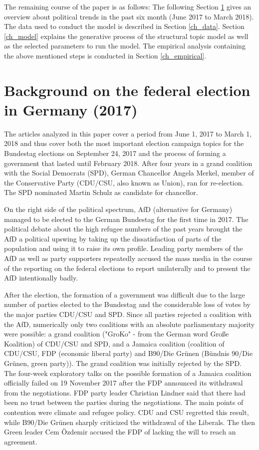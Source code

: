 \documentclass[12pt,a4paper,notitlepage]{article}
\begin{document}
The remaining course of the paper is as follows: The following Section \ref{ch_elections} gives an overview about political trends in the past six month (June 2017 to March 2018). The data used to conduct the model is described in Section \ref{ch_data}. Section \ref{ch_model} explains the generative process of the structural topic model as well as the selected parameters to run the model. The empirical analysis containing the above mentioned steps is conducted in Section \ref{ch_empirical}. 
 
\section{Background on the federal election in Germany (2017)}\label{ch_elections}

The articles analyzed in this paper cover a period from June 1, 2017 to March 1, 2018 and thus cover both the most important election campaign topics for the Bundestag elections on September 24, 2017 and the process of forming a government that lasted until February 2018. After four years in a grand coalition with the Social Democrats (SPD), German Chancellor Angela Merkel, member of the Conservative Party (CDU/CSU, also known as Union), ran for re-election. The SPD nominated Martin Schulz as candidate for chancellor. 

On the right side of the political spectrum, AfD (alternative for Germany) managed to be elected to the German Bundestag for the first time in 2017. The political debate about the high refugee numbers of the past years brought the AfD a political upswing by taking up the dissatisfaction of parts of the population and using it to raise its own profile. Leading party members of the AfD as well as party supporters repeatedly accused the mass media in the course of the reporting on the federal elections to report unilaterally and to present the AfD intentionally badly.

After the election, the formation of a government was difficult due to the large number of parties elected to the Bundestag and the considerable loss of votes by the major parties CDU/CSU and SPD. Since all parties rejected a coalition with the AfD, numerically only two coalitions with an absolute parliamentary majority were possible: a grand coalition ("GroKo" - from the German word Große Koalition) of CDU/CSU and SPD, and a Jamaica coalition (coalition of CDU/CSU, FDP (economic liberal party) and B90/Die Grünen (Bündnis 90/Die Grünen, green party)). The grand coalition was initially rejected by the SPD. The four-week exploratory talks on the possible formation of a Jamaica coalition officially failed on 19 November 2017 after the FDP announced its withdrawal from the negotiations. FDP party leader Christian Lindner said that there had been no trust between the parties during the negotiations. The main points of contention were climate and refugee policy. CDU and CSU regretted this result, while B90/Die Grünen sharply criticized the withdrawal of the Liberals. The then Green leader Cem Özdemir accused the FDP of lacking the will to reach an agreement.
\end{document}
